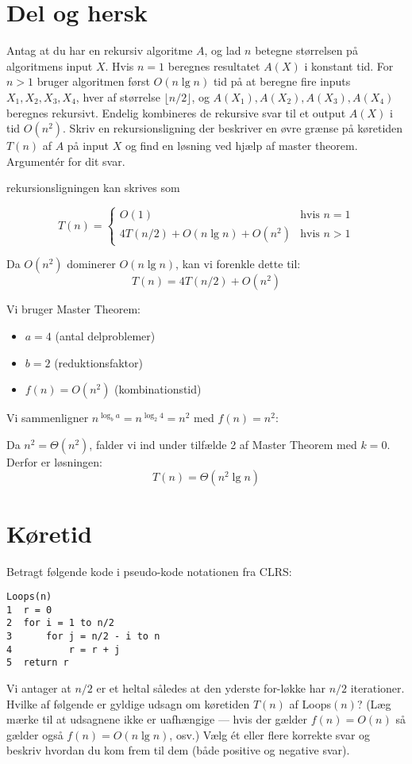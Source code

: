 \documentclass{article}
\theoremstyle{definition}
\begin{document}
\section{Del og hersk}
Antag at du har en rekursiv algoritme $A$, og lad $n$ betegne størrelsen på algoritmens 
input $X$. Hvis $n=1$ beregnes resultatet $A(X)$ i konstant tid. For $n > 1$ bruger algoritmen 
først $O(n\lg n)$ tid på at beregne fire inputs $X_1, X_2, X_3, X_4$, hver af størrelse $\lfloor n/2 \rfloor$, og 
$A(X_1), A(X_2), A(X_3), A(X_4)$ beregnes rekursivt. Endelig kombineres de rekursive svar til 
et output $A(X)$ i tid $O(n^2)$. Skriv en rekursionsligning der beskriver en øvre grænse 
på køretiden $T(n)$ af $A$ på input $X$ og find en løsning ved hjælp af master theorem. 
Argumentér for dit svar.

rekursionsligningen kan skrives som

\[
T(n) = \begin{cases}
O(1) & \text{hvis } n = 1 \\
4T(n/2) + O(n\lg n) + O(n^2) & \text{hvis } n > 1
\end{cases}
\]

Da $O(n^2)$ dominerer $O(n\lg n)$, kan vi forenkle dette til:
\[
T(n) = 4T(n/2) + O(n^2)
\]

Vi bruger Master Theorem:
\begin{itemize}
    \item $a = 4$ (antal delproblemer)
    \item $b = 2$ (reduktionsfaktor)
    \item $f(n) = O(n^2)$ (kombinationstid)
\end{itemize}

Vi sammenligner $n^{\log_b a} = n^{\log_2 4} = n^2$ med $f(n) = n^2$:

Da $n^2 = \Theta(n^2)$, falder vi ind under tilfælde 2 af Master Theorem med $k = 0$.
Derfor er løsningen:
\[ T(n) = \Theta(n^2 \lg n) \]

\section{Køretid}
Betragt følgende kode i pseudo-kode notationen fra CLRS:

\begin{verbatim}
Loops(n)
1  r = 0
2  for i = 1 to n/2
3      for j = n/2 - i to n
4          r = r + j
5  return r
\end{verbatim}

Vi antager at $n/2$ er et heltal således at den yderste for-løkke har $n/2$ iterationer. Hvilke af følgende er gyldige udsagn om køretiden $T(n)$ af Loops$(n)$? (Læg mærke til at udsagnene ikke er uafhængige --- hvis der gælder $f(n) = O(n)$ så gælder også $f(n) = O(n\lg n)$, osv.) Vælg ét eller flere korrekte svar og beskriv hvordan du kom frem til dem (både positive og negative svar).
\end{document}
